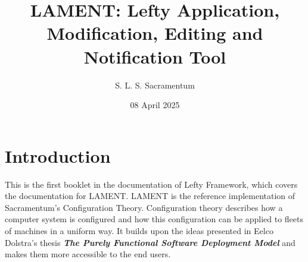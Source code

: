 \documentclass{amsbook}
\title{LAMENT: Lefty Application, Modification, Editing and Notification Tool}
\author{S. L. S. Sacramentum}
\date{08 April 2025}
\begin{document}
    \maketitle
    \tableofcontents
    \section{Introduction}
    This is the first booklet in the documentation of Lefty Framework, which covers the documentation for LAMENT.
    LAMENT is the reference implementation of Sacramentum's Configuration Theory. Configuration theory describes
    how a computer system is configured and how this configuration can be applied to fleets of machines in a
    uniform way. It builds upon the ideas presented in Eelco Dolstra's thesis \textbf{\textit{The Purely Functional Software Deployment Model}} and
    makes them more accessible to the end users.
\end{document}
